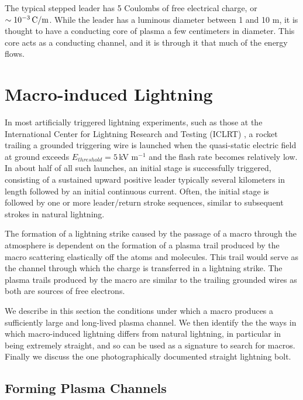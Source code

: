 \documentclass[%
reprint,
 amsmath,amssymb,
 aps,
 prd,
]{revtex4-2}
\begin{document}
    The typical stepped leader has 5 Coulombs of free electrical charge, or $\sim10^{-3} \, \rm{C/m}$. While the leader has a luminous diameter between 1 and 10 m, it is thought to have a conducting core of plasma a few centimeters in diameter. This core acts as a conducting channel, and it is through it that much of the energy flows.



\section{Macro-induced \textbf{}Lightning} %
\label{sec:macro_induced_lightning}

    In most artificially triggered lightning experiments, such as those at the International Center for Lightning Research and Testing (ICLRT) \cite{Hill2012, Hill2013}, a rocket trailing a grounded triggering wire is launched when the quasi-static electric field at ground exceeds $E_{threshold} = 5\,$kV m$^{-1}$ and the flash rate becomes relatively low. In about half of all such launches, an initial stage is successfully triggered, consisting of a sustained upward positive leader typically several kilometers in length followed by an initial continuous current. Often, the initial stage is followed by one or more leader/return stroke sequences, similar to subsequent strokes in natural lightning. 

    The formation of a lightning strike caused by the passage of a macro through the atmosphere is dependent on the formation of a plasma trail produced by the macro scattering elastically off the atoms and molecules. This trail would serve as the channel through which the charge is transferred in a lightning strike. The plasma trails produced by the macro are similar to the trailing grounded wires as both are sources of free electrons.  

    We describe in this section the conditions under which a macro produces a sufficiently large and long-lived plasma channel.  We then identify the the ways in which macro-induced lightning differs from natural lightning, in particular in being extremely straight, and so can be used as a signature to search for macros.  Finally we discuss the one photographically documented straight lightning bolt.

    \subsection{Forming Plasma Channels} %
    \label{sub:macro_induced_plasma_channels}
\end{document}
